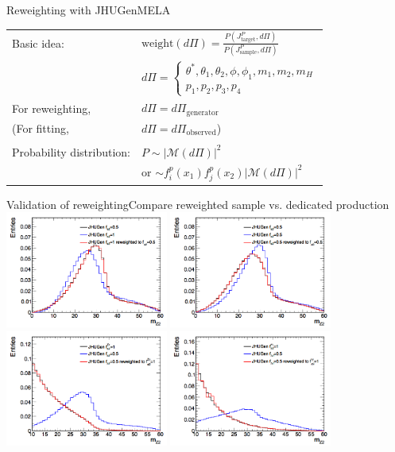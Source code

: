 \documentclass[usenames,dvipsnames,svgnames,table]{beamer}
\begin{document}
\begin{frame}{Reweighting with JHUGenMELA}
\begin{tabular}{ll}
Basic idea: & $\text{weight}\left(d\Pi\right)=\frac{P(J^P_\text{target},d\Pi)}{P(J^P_\text{sample},d\Pi)}$ \\
& $d\Pi = \begin{cases} \theta^*, \theta_1, \theta_2, \phi, \phi_1, m_1, m_2, m_H \\ p_1, p_2, p_3, p_4 \end{cases}$ \\
For reweighting, & $d\Pi = d\Pi_\text{generator}$ \\
(For fitting, & $d\Pi = d\Pi_\text{observed}$) \\
& \\
Probability distribution: & $P\sim\left|\mathcal{M}(d\Pi)\right|^2$ \\
 & or $\sim f^p_i(x_1)f^p_j(x_2)\left|\mathcal{M}(d\Pi)\right|^2$

\end{tabular}
\end{frame}

\begin{frame}{Validation of reweighting}{Compare reweighted sample vs. dedicated production}
\centering
\includegraphics[width=0.4\textwidth]{reweightingvalidation/fa2halffa31} %
\includegraphics[width=0.4\textwidth]{reweightingvalidation/fa2halffa3half}\\
\includegraphics[width=0.4\textwidth]{reweightingvalidation/fa2Zgamma} %
\includegraphics[width=0.4\textwidth]{reweightingvalidation/flambda1fa3Zgamma}
\end{frame}
\end{document}
